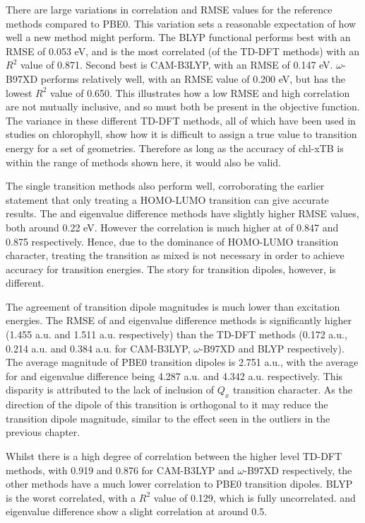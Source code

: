 There are large variations in correlation and RMSE values for the reference methods
compared to PBE0. This variation sets a reasonable expectation of how well a new 
method might perform. The BLYP functional performs best with an RMSE of 0.053 eV,
and is the most correlated (of the TD-DFT methods) with an $R^2$ value of 0.871.
Second best is CAM-B3LYP, with an RMSE of 0.147 eV. $\omega$-B97XD performs relatively
well, with an RMSE value of 0.200 eV, but has the lowest $R^2$ value of 0.650. This 
illustrates how a low RMSE and high correlation are not mutually inclusive, and
so must both be present in the objective function. 
The variance in these different TD-DFT methods, all of which have been used in studies
on chlorophyll, show how it is difficult to assign a true value to transition energy
for a set of geometries. Therefore as long as the accuracy of chl-xTB is within 
the range of methods shown here, it would also be valid.

The single transition methods also perform well, corroborating the earlier statement
that only treating a HOMO-LUMO transition can give accurate results. The \dscf and
eigenvalue difference methods have slightly higher RMSE values, both around 0.22 eV.
However the correlation is much higher at of 0.847 and 0.875 respectively. Hence,
due to the dominance of HOMO-LUMO transition character, treating the transition
as mixed is not necessary in order to achieve accuracy for transition energies. 
The story for transition dipoles, however, is different.

The agreement of transition dipole magnitudes is much lower than excitation energies.
The RMSE of \dscf and eigenvalue difference methods is significantly higher (1.455
a.u. and 1.511 a.u. respectively) than the TD-DFT methods (0.172 a.u., 0.214 a.u.
and 0.384 a.u. for CAM-B3LYP, $\omega$-B97XD and BLYP respectively). The average
magnitude of PBE0 transition dipoles is 2.751 a.u., with the average for \dscf and 
eigenvalue difference being 4.287 a.u. and 4.342 a.u. respectively. This disparity
is attributed to the lack of inclusion of $Q_x$ transition character. As the direction
of the dipole of this transition is orthogonal to \Qy it may reduce the transition 
dipole magnitude, similar to the effect seen in the outliers in the previous chapter.

Whilst there is a high degree of correlation between the higher level TD-DFT methods,
with 0.919 and 0.876 for CAM-B3LYP and $\omega$-B97XD respectively, the other methods
have a much lower correlation to PBE0 transition dipoles. BLYP is the worst correlated,
with a $R^2$ value of 0.129, which is fully uncorrelated. \dscf and eigenvalue difference
show a slight correlation at around 0.5.


